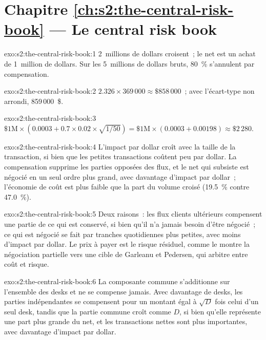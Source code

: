 \section*{Chapitre \ref{ch:s2:the-central-risk-book} --- Le central risk book}

\begin{solution}{exo:s2:the-central-risk-book:1}
2~millions de dollars croisent~; le net est un achat de 1~million de dollars. Sur les 5~millions de dollars bruts, 80~\% s'annulent par compensation.
\end{solution}

\begin{solution}{exo:s2:the-central-risk-book:2}
$2.326 \times 369\,000 \approx \$858\,000$~; avec l'écart-type non arrondi, 859\,000~\$.
\end{solution}

\begin{solution}{exo:s2:the-central-risk-book:3}
$\$1\text{M} \times (0.0003 + 0.7 \times 0.02 \times \sqrt{1/50}) = \$1\text{M} \times (0.0003 + 0.00198) \approx \$2\,280$.
\end{solution}

\begin{solution}{exo:s2:the-central-risk-book:4}
L'impact par dollar croît avec la taille de la transaction, si bien que les petites transactions coûtent peu par dollar. La compensation supprime les parties opposées des flux, et le net
qui subsiste est négocié en un seul ordre plus grand, avec davantage d'impact par dollar~; l'économie de coût est plus faible que la part du volume croisé (19.5~\%
contre 47.0~\%).
\end{solution}

\begin{solution}{exo:s2:the-central-risk-book:5}
Deux raisons~: les flux clients ultérieurs compensent une partie de ce qui est conservé, si bien qu'il n'a jamais besoin d'être négocié~; ce qui est négocié se fait par tranches quotidiennes plus petites, avec moins d'impact par dollar.
Le prix à payer est le risque résiduel, comme le montre la négociation partielle vers une cible de Garleanu et Pedersen, qui arbitre entre coût et risque.
\end{solution}

\begin{solution}{exo:s2:the-central-risk-book:6}
La composante commune s'additionne sur l'ensemble des desks et ne se compense jamais. Avec davantage de desks, les parties indépendantes se compensent pour un montant égal à $\sqrt D$ fois celui d'un seul desk, tandis que la
partie commune croît comme $D$, si bien qu'elle représente une part plus grande du net, et les transactions nettes sont plus importantes, avec davantage d'impact par dollar.
\end{solution}

